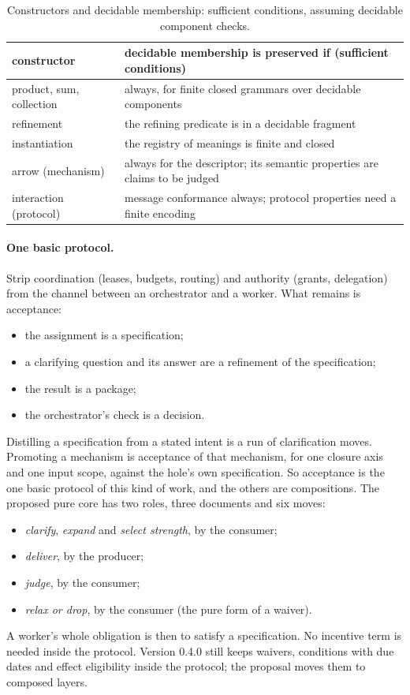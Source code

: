\documentclass[11pt]{article}
\theoremstyle{definition}
\theoremstyle{remark}
\begin{document}
\begin{table}[t]
\centering\small
\begin{tabularx}{\linewidth}{@{}lX@{}}
\toprule
constructor & decidable membership is preserved if (sufficient conditions) \\
\midrule
product, sum, collection & always, for finite closed grammars over decidable components \\
refinement & the refining predicate is in a decidable fragment \\
instantiation & the registry of meanings is finite and closed \\
arrow (mechanism) & always for the descriptor; its semantic properties are claims to be judged \\
interaction (protocol) & message conformance always; protocol properties need a finite encoding \\
\bottomrule
\end{tabularx}
\caption{Constructors and decidable membership: sufficient conditions, assuming decidable component checks.}\label{tab:dec}
\end{table}

\paragraph{One basic protocol.} Strip coordination (leases, budgets, routing) and authority
(grants, delegation) from the channel between an orchestrator and a worker. What remains is
acceptance:
\begin{itemize}[itemsep=1pt]
\item the assignment is a specification;
\item a clarifying question and its answer are a refinement of the specification;
\item the result is a package;
\item the orchestrator's check is a decision.
\end{itemize}
Distilling a specification from a stated intent is a run of clarification moves. Promoting a
mechanism is acceptance of that mechanism, for one closure axis and one input scope, against the
hole's own specification. So acceptance is the one basic protocol of this kind of work, and the
others are compositions. The proposed pure core has two roles, three documents and six moves:
\begin{itemize}[itemsep=1pt]
\item \emph{clarify}, \emph{expand} and \emph{select strength}, by the consumer;
\item \emph{deliver}, by the producer;
\item \emph{judge}, by the consumer;
\item \emph{relax or drop}, by the consumer (the pure form of a waiver).
\end{itemize}
A worker's whole obligation is then to satisfy a specification. No incentive term is needed inside
the protocol. Version 0.4.0 still keeps waivers, conditions with due dates and effect eligibility
inside the protocol; the proposal moves them to composed layers.
\end{document}

